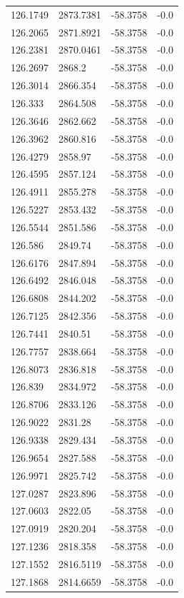 \begin{table}[H]
\begin{tabular}{llll}
126.1749 & 2873.7381 & -58.3758 & -0.0 \\
126.2065 & 2871.8921 & -58.3758 & -0.0 \\
126.2381 & 2870.0461 & -58.3758 & -0.0 \\
126.2697 & 2868.2 & -58.3758 & -0.0 \\
126.3014 & 2866.354 & -58.3758 & -0.0 \\
126.333 & 2864.508 & -58.3758 & -0.0 \\
126.3646 & 2862.662 & -58.3758 & -0.0 \\
126.3962 & 2860.816 & -58.3758 & -0.0 \\
126.4279 & 2858.97 & -58.3758 & -0.0 \\
126.4595 & 2857.124 & -58.3758 & -0.0 \\
126.4911 & 2855.278 & -58.3758 & -0.0 \\
126.5227 & 2853.432 & -58.3758 & -0.0 \\
126.5544 & 2851.586 & -58.3758 & -0.0 \\
126.586 & 2849.74 & -58.3758 & -0.0 \\
126.6176 & 2847.894 & -58.3758 & -0.0 \\
126.6492 & 2846.048 & -58.3758 & -0.0 \\
126.6808 & 2844.202 & -58.3758 & -0.0 \\
126.7125 & 2842.356 & -58.3758 & -0.0 \\
126.7441 & 2840.51 & -58.3758 & -0.0 \\
126.7757 & 2838.664 & -58.3758 & -0.0 \\
126.8073 & 2836.818 & -58.3758 & -0.0 \\
126.839 & 2834.972 & -58.3758 & -0.0 \\
126.8706 & 2833.126 & -58.3758 & -0.0 \\
126.9022 & 2831.28 & -58.3758 & -0.0 \\
126.9338 & 2829.434 & -58.3758 & -0.0 \\
126.9654 & 2827.588 & -58.3758 & -0.0 \\
126.9971 & 2825.742 & -58.3758 & -0.0 \\
127.0287 & 2823.896 & -58.3758 & -0.0 \\
127.0603 & 2822.05 & -58.3758 & -0.0 \\
127.0919 & 2820.204 & -58.3758 & -0.0 \\
127.1236 & 2818.358 & -58.3758 & -0.0 \\
127.1552 & 2816.5119 & -58.3758 & -0.0 \\
127.1868 & 2814.6659 & -58.3758 & -0.0 \\

\end{tabular}
\end{table}
